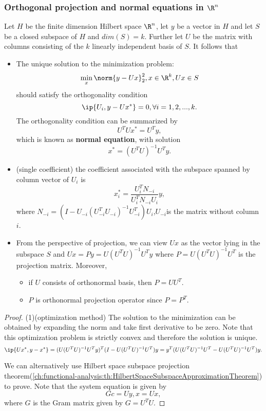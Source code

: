 \begin{refsection}
\subsubsection{Orthogonal projection and normal equations in $\R^n$}
\begin{theorem}\label{ch:functional-analysis:th:normalequation}
	Let $H$ be the finite dimension Hilbert space $\R^n$, let $y$ be a vector in $H$ and let $S$ be a closed subspace of $H$ and $dim(S)=k$. Further let $U$ be the matrix with columns consisting of the $k$ linearly independent basis of $S$. It follows that
	\begin{itemize}
		\item The unique solution to the minimization problem:
		$$\min_x \norm{y - Ux}^2_2,x \in \R^k, Ux\in S$$ should satisfy the orthogonality condition $$\ip{U_i, y - Ux^*} = 0, \forall i=1,2,...,k.$$
		The orthogonality condition can be summarized by
		$$U^TUx^* = U^Ty,$$
		which is known as \textbf{normal equation}, with solution
		$$x^* = (U^TU)^{-1}U^Ty.$$
		\item (single coefficient) the coefficient associated with the subspace spanned by column vector of $U_i$ is
		$$x^*_i = \frac{U_i^TN_{-i}}{U_i^TN_{-i}U_i}y,$$
		where $N_{-i} = (I - U_{-i}(U^T_{-i}U_{-i})^{-1}U^T_{-i})U_i$,$U_{-i}$is the matrix without column $i$.
		\item From the perspective of projection, we can view $Ux$ as the vector lying in the subspace $S$ and $Ux = Py = U(U^TU)^{-1}U^Ty$
		where $P = U(U^TU)^{-1}U^T$ is the projection matrix. Moreover, 
		\begin{itemize}
			\item if $U$ consists of orthonormal basis, then $P = UU^T$.
			\item $P$ is orthonormal projection operator since $P = P^T$.
		\end{itemize}
	\end{itemize} 
\end{theorem}
\begin{proof}
	(1)(optimization method) The solution to the minimization can be obtained by expanding the norm and take first derivative to be zero. Note that this optimization problem is strictly convex and therefore the solution is unique.
	$$\ip{Ux^*,y-x^*} = (U(U^TU)^{-1}U^Ty)^T(I-U(U^TU)^{-1}U^T)y = y^T(U(U^TU)^{-1}U^T- U(U^TU)^{-1}U^T)y.$$
	
	We can alternatively use Hilbert space subspace projection theorem(\autoref{ch:functional-analysis:th:HilbertSpaceSubspaceApproximationTheorem}) to prove.
	Note that the system equation is given by 
	$$Gc = Uy, x = Ux,$$
	where $G$ is the Gram matrix given by $G = U^TU$.
	

\end{proof}
\end{refsection}
